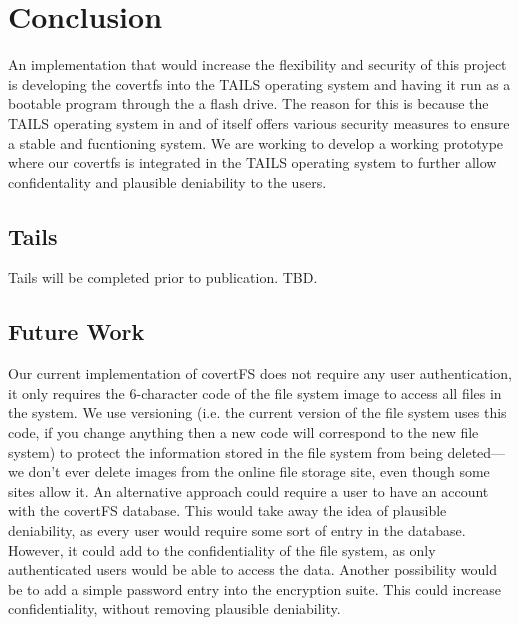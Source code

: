 \documentclass[12pt,journal,compsoc]{IEEEtran}
\begin{document}
\section{Conclusion}

An implementation that would increase the flexibility and security of this project is developing the covertfs into the TAILS operating system and having it run as a bootable program through the a flash drive. The reason for this is because the TAILS operating system in and of itself offers various security measures to ensure a stable and fucntioning system. We are working to develop a working prototype where our covertfs is integrated in the TAILS operating system to further allow confidentality and plausible deniability to the users. 

\subsection{Tails}

Tails will be completed prior to publication. TBD. 

\subsection{Future Work}
Our current implementation of covertFS does not require any user authentication, it only requires the 6-character code of the file system image to access all files in the system. We use versioning (i.e. the current version of the file system uses this code, if you change anything then a new code will correspond to the new file system) to protect the information stored in the file system from being deleted--- we don't ever delete images from the online file storage site, even though some sites allow it. An alternative approach could require a user to have an account with the covertFS database. This would take away the idea of plausible deniability, as every user would require some sort of entry in the database. However, it could add to the confidentiality of the file system, as only authenticated users would be able to access the data.
Another possibility would be to add a simple password entry into the encryption suite. This could increase confidentiality, without removing plausible deniability.
\end{document}
